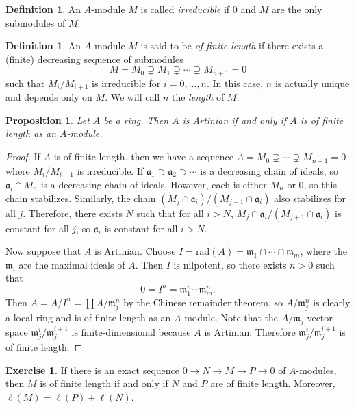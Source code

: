 \documentclass[leqno, openany]{memoir}
\newtheorem{prop}[thm]{Proposition}
\theoremstyle{definition}
\newtheorem{defn}[thm]{Definition}
\newtheorem{exer}[thm]{Exercise}
\theoremstyle{remark}
\theoremstyle{plain}
\theoremstyle{definition}
\theoremstyle{remark}
\newcommand{\mf}[1]{\mathfrak{#1}}
\newcommand{\mr}[1]{\mathrm{#1}}
\begin{document}
\begin{defn}
    An $A$-module $M$ is called \textit{irreducible} if $0$ and $M$ are the only submodules of $M$.
\end{defn}

\begin{defn}
    An $A$-module $M$ is said to be \textit{of finite length}  if there exists a (finite) decreasing sequence of submodules 
    \[ M = M_0 \supsetneq M_1 \supsetneq \cdots \supsetneq M_{n+1} = 0 \]
    such that $M_i / M_{i+1}$ is irreducible for $i = 0, \ldots, n$. In this case, $n$ is actually unique and depends only on $M$. We will call $n$ the \textit{length} of $M$. 
\end{defn}

\begin{prop}
    Let $A$ be a ring. Then $A$ is Artinian if and only if $A$ is of finite length as an $A$-module.
\end{prop}

\begin{proof}
    If $A$ is of finite length, then we have a sequence $A = M_0 \supsetneq \cdots \supsetneq M_{n+1} = 0$ where $M_i / M_{i+1}$ is irreducible. If $\mf{a}_1 \supset \mf{a}_2 \supset \cdots$ is a decreasing chain of ideals, so $\mf{a}_i \cap M_n$ is a decreasing chain of ideals. However, each is either $M_n$ or $0$, so this chain stabilizes. Similarly, the chain $(M_j \cap \mf{a}_i) / (M_{j+1} \cap \mf{a}_i)$ also stabilizes for all $j$. Therefore, there exists $N$ such that for all $i > N$, $M_j \cap \mf{a}_i / (M_{j+1} \cap \mf{a}_i)$ is constant for all $j$, so $\mf{a}_i$ is constant for all $i > N$.

    Now suppose that $A$ is Artinian. Choose $I = \mr{rad}(A) = \mf{m}_1 \cap \cdots \cap \mf{m}_m$, where the $\mf{m}_i$ are the maximal ideals of $A$. Then $I$ is nilpotent, so there exists $n > 0$ such that
    \[ 0 = I^n = \mf{m}_1^n \cdots \mf{m}_m^n. \]
    Then $A = A / I^n = \prod A/ \mf{m}_j^n$ by the Chinese remainder theorem, so $A / \mf{m}_j^n$ is clearly a local ring and is of finite length as an $A$-module. Note that the $A/\mf{m}_j$-vector space $\mf{m}_j^i / \mf{m}_j^{i+1}$ is finite-dimensional because $A$ is Artinian. Therefore $\mf{m}_j^i / \mf{m}_j^{i+1}$ is of finite length.
\end{proof}

\begin{exer}
    If there is an exact sequence $0 \to N \to M \to P \to 0$ of $A$-modules, then $M$ is of finite length if and only if $N$ and $P$ are of finite length. Moreover, $\ell(M) = \ell(P) + \ell(N)$.
\end{exer}
\end{document}
